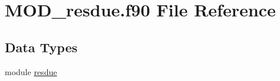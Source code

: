 \hypertarget{MOD__resdue_8f90}{\section{M\-O\-D\-\_\-resdue.\-f90 File Reference}
\label{MOD__resdue_8f90}
}
\subsection*{Data Types}
\begin{DoxyCompactItemize}
\item 
module \hyperlink{classresdue}{resdue}
\end{DoxyCompactItemize}
